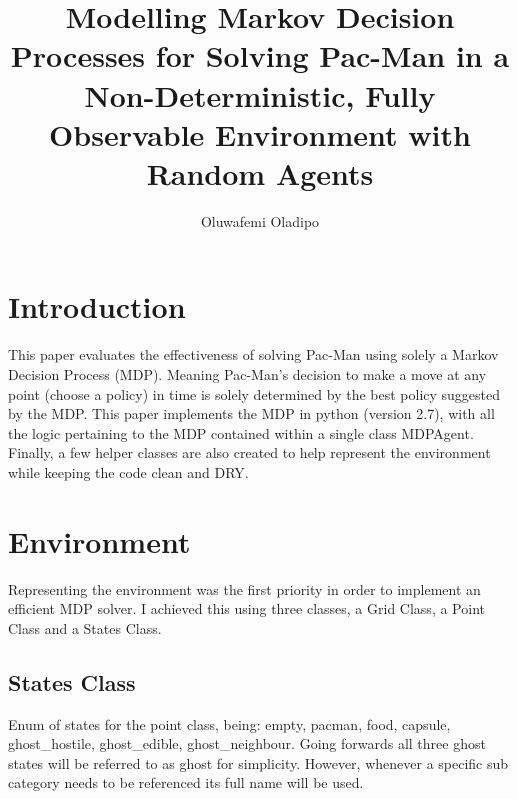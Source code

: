\documentclass[letterpaper, 11pt, journal, final]{IEEEtran}
\title{\LARGE \bf
Modelling Markov Decision Processes for Solving Pac-Man in a Non-Deterministic, Fully Observable Environment with Random Agents
}
\author{Oluwafemi Oladipo}
\begin{document}
\maketitle




\section{Introduction}
This paper evaluates the effectiveness of solving Pac-Man using solely a Markov Decision Process (MDP). Meaning Pac-Man's decision to make a move at any point (choose a policy) in time is solely determined by the best policy suggested by the MDP. This paper implements the MDP in python (version 2.7), with all the logic pertaining to the MDP contained within a single class MDPAgent. Finally, a few helper classes are also created to help represent the environment while keeping the code clean\cite{martin2009clean} and DRY\cite{dryCode}.

\section{Environment}
Representing the environment was the first priority in order to implement an efficient MDP solver. I achieved this using three classes, a Grid Class, a Point Class and a States Class.

\subsection{States Class}
Enum of states for the point class, being: empty, pacman, food, capsule, ghost\_hostile, ghost\_edible, ghost\_neighbour. Going forwards all three ghost states will be referred to as ghost for simplicity. However, whenever a specific sub category needs to be referenced its full name will be used.
\end{document}
